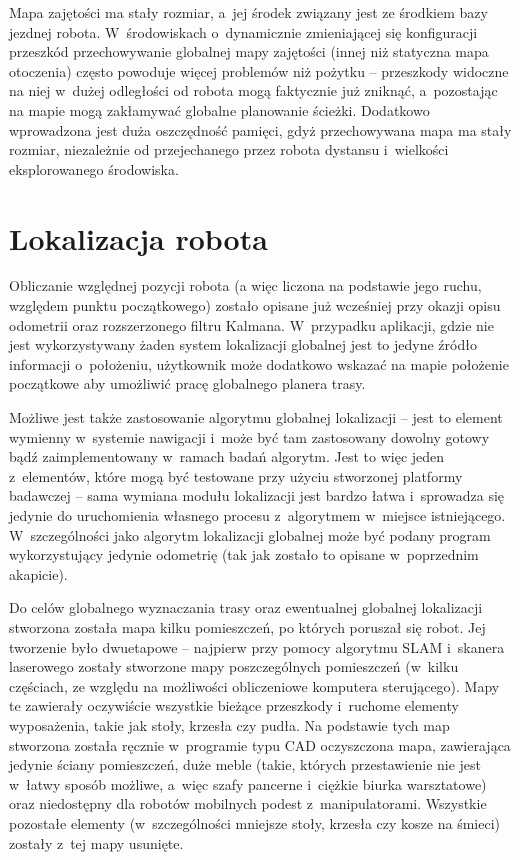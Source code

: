 Mapa zajętości ma stały rozmiar, a~jej środek związany jest ze środkiem bazy
jezdnej robota. W~środowiskach o~dynamicznie zmieniającej się konfiguracji
przeszkód przechowywanie globalnej mapy zajętości (innej niż statyczna mapa
otoczenia) często powoduje więcej problemów niż pożytku -- przeszkody widoczne
na niej w~dużej odległości od robota mogą faktycznie już zniknąć, a~pozostając
na mapie mogą zakłamywać globalne planowanie ścieżki. Dodatkowo wprowadzona jest
duża oszczędność pamięci, gdyż przechowywana mapa ma stały rozmiar, niezależnie
od przejechanego przez robota dystansu i~wielkości eksplorowanego środowiska.

\section{Lokalizacja robota}

Obliczanie względnej pozycji robota (a więc liczona na podstawie jego ruchu, względem
punktu początkowego) zostało opisane już wcześniej przy okazji opisu odometrii
oraz rozszerzonego filtru Kalmana. W~przypadku aplikacji, gdzie nie jest wykorzystywany
żaden system lokalizacji globalnej jest to jedyne źródło informacji o~położeniu,
użytkownik może dodatkowo wskazać na mapie położenie początkowe aby umożliwić pracę
globalnego planera trasy.

Możliwe jest także zastosowanie algorytmu globalnej lokalizacji -- jest to element
wymienny w~systemie nawigacji i~może być tam zastosowany dowolny gotowy bądź zaimplementowany
w~ramach badań algorytm. Jest to więc jeden z~elementów, które mogą być testowane
przy użyciu stworzonej platformy badawczej -- sama wymiana modułu lokalizacji jest
bardzo łatwa i~sprowadza się jedynie do uruchomienia własnego procesu z~algorytmem
w~miejsce istniejącego. W~szczególności jako algorytm lokalizacji globalnej może być
podany program wykorzystujący jedynie odometrię (tak jak zostało to opisane w~poprzednim
akapicie).

Do celów globalnego wyznaczania trasy oraz ewentualnej globalnej lokalizacji stworzona
została mapa kilku pomieszczeń, po których poruszał się robot. Jej tworzenie było
dwuetapowe -- najpierw przy pomocy algorytmu SLAM i~skanera laserowego zostały
stworzone mapy poszczególnych pomieszczeń (w~kilku częściach, ze względu na możliwości
obliczeniowe komputera sterującego). Mapy te zawierały oczywiście wszystkie bieżące
przeszkody i~ruchome elementy wyposażenia, takie jak stoły, krzesła czy pudła.
Na podstawie tych map stworzona została ręcznie w~programie typu CAD oczyszczona
mapa, zawierająca jedynie ściany pomieszczeń, duże meble (takie, których przestawienie
nie jest w~łatwy sposób możliwe, a~więc szafy pancerne i~ciężkie biurka warsztatowe)
oraz niedostępny dla robotów mobilnych podest z~manipulatorami. Wszystkie pozostałe
elementy (w~szczególności mniejsze stoły, krzesła czy kosze na śmieci) zostały z~tej
mapy usunięte.

